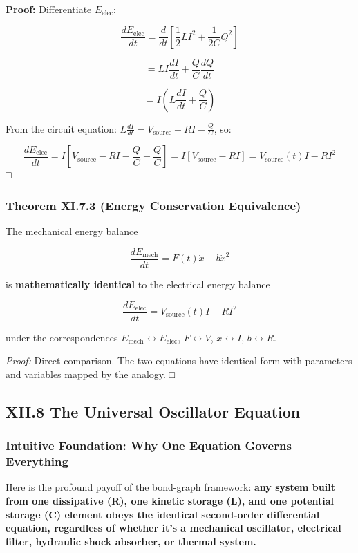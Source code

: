 \documentclass[
]{article}
\begin{document}
\textbf{Proof:} Differentiate \(E_{\text{elec}}\):

\[\frac{dE_{\text{elec}}}{dt} = \frac{d}{dt}\left[\frac{1}{2}LI^2 + \frac{1}{2C}Q^2\right]\]

\[= LI\frac{dI}{dt} + \frac{Q}{C}\frac{dQ}{dt}\]

\[= I\left(L\frac{dI}{dt} + \frac{Q}{C}\right)\]

From the circuit equation:
\(L\frac{dI}{dt} = V_{\text{source}} - RI - \frac{Q}{C}\), so:

\[\frac{dE_{\text{elec}}}{dt} = I\left[V_{\text{source}} - RI - \frac{Q}{C} + \frac{Q}{C}\right] = I[V_{\text{source}} - RI] = V_{\text{source}}(t) I - RI^2\]
□

\subsubsection{Theorem XI.7.3 (Energy Conservation
Equivalence)}\label{theorem-xi.7.3-energy-conservation-equivalence}

The mechanical energy balance

\[\frac{dE_{\text{mech}}}{dt} = F(t)\dot{x} - b\dot{x}^2\]

is \textbf{mathematically identical} to the electrical energy balance

\[\frac{dE_{\text{elec}}}{dt} = V_{\text{source}}(t) I - RI^2\]

under the correspondences
\(E_{\text{mech}} \leftrightarrow E_{\text{elec}}\),
\(F \leftrightarrow V\), \(\dot{x} \leftrightarrow I\),
\(b \leftrightarrow R\).

\emph{Proof:} Direct comparison. The two equations have identical form
with parameters and variables mapped by the analogy. □

\subsection{XII.8 The Universal Oscillator
Equation}\label{xii.8-the-universal-oscillator-equation}

\subsubsection{Intuitive Foundation: Why One Equation Governs
Everything}\label{intuitive-foundation-why-one-equation-governs-everything}

Here is the profound payoff of the bond-graph framework: \textbf{any
system built from one dissipative (R), one kinetic storage (L), and one
potential storage (C) element obeys the identical second-order
differential equation, regardless of whether it's a mechanical
oscillator, electrical filter, hydraulic shock absorber, or thermal
system.}
\end{document}
